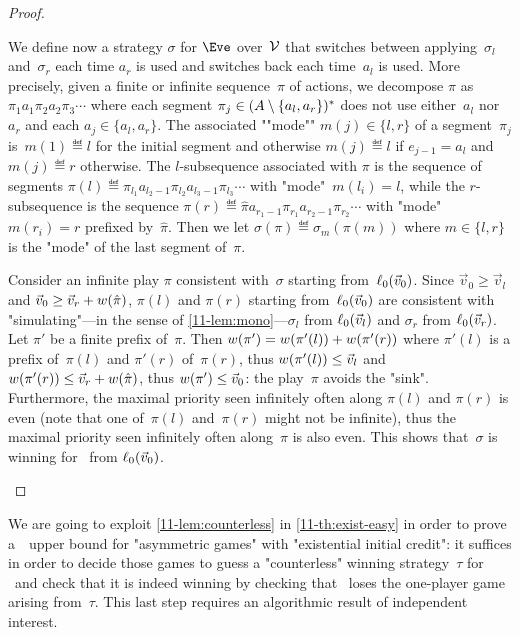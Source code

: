 \begin{proof}
  \begin{scope}
    We define now a strategy $\sigma$ for $\Eve$ over~$\mathcal V$ that
    switches between applying~$\sigma_l$ and~$\sigma_r$ each time
    $a_r$ is used and switches back each time~$a_l$ is used.  More
    precisely, given a finite or infinite sequence~$\pi$ of actions,
    we decompose $\pi$ as $\pi_1 a_1 \pi_2 a_2 \pi_3\cdots$ where each
    segment $\pi_j\in(A\setminus\{a_l,a_r\})^\ast$ does not use
    either~$a_l$ nor~$a_r$ and each $a_j\in\{a_l,a_r\}$.  The
    associated ""mode"" $m(j)\in\{l,r\}$ of a segment~$\pi_j$
    is~$m(1)\eqdef l$ for the initial segment and otherwise
    $m(j)\eqdef l$ if $e_{j-1}=a_l$ and $m(j)\eqdef r$ otherwise.  The
    $l$-subsequence associated with $\pi$ is the sequence of segments
    $\pi(l)\eqdef\pi_{l_1}a_{l_2-1}\pi_{l_2}a_{l_3-1}\pi_{l_3}\cdots$
    with "mode"~$m(l_i)=l$, while the $r$-subsequence is the sequence
    $\pi(r)\eqdef\hat\pi a_{r_1-1}\pi_{r_1}a_{r_2-1}\pi_{r_2}\cdots$
    with "mode"~$m(r_i)=r$ prefixed by~$\hat\pi$.  Then we let
    $\sigma(\pi)\eqdef\sigma_{m}(\pi(m))$ where $m\in\{l,r\}$ is the
    "mode" of the last segment of~$\pi$.

    Consider an infinite play $\pi$ consistent with~$\sigma$ starting
    from~$\ell_0(\vec v_0)$.  Since $\vec v_0\geq\vec v_l$ and
    $\vec v_0\geq \vec v_r+w(\hat\pi)$, $\pi(l)$ and $\pi(r)$
    starting from~$\ell_0(\vec v_0)$ are consistent with
    "simulating"---in the sense of \cref{11-lem:mono}---$\sigma_l$
    from $\ell_0(\vec v_l)$ and $\sigma_r$ from $\ell_0(\vec v_r)$.
    Let $\pi'$ be a finite prefix of~$\pi$.  Then
    $w(\pi')=w(\pi'(l))+w(\pi'(r))$ where $\pi'(l)$
    is a prefix of~$\pi(l)$ and $\pi'(r)$ of~$\pi(r)$, thus
    $w(\pi'(l))\leq\vec v_l$ and
    $w(\pi'(r))\leq\vec v_r+w(\hat\pi)$, thus
    $w(\pi')\leq\vec v_0$: the play~$\pi$ avoids the "sink".
    Furthermore, the maximal priority seen infinitely often along
    $\pi(l)$ and $\pi(r)$ is even (note that one of~$\pi(l)$
    and~$\pi(r)$ might not be infinite), thus the maximal priority
    seen infinitely often along~$\pi$ is also even.  This shows
    that~$\sigma$ is winning for \Eve\ from $\ell_0(\vec v_0)$.
  \end{scope}
\end{proof}

We are going to exploit \cref{11-lem:counterless}
in \cref{11-th:exist-easy} in order to prove a~\coNP\ upper bound for
"asymmetric games" with "existential initial credit": it suffices in
order to decide those games to guess a "counterless" winning
strategy~$\tau$ for \Adam\ and check that it is indeed winning by
checking that \Eve\ loses the one-player game arising from~$\tau$.
This last step requires an algorithmic result of independent interest.

